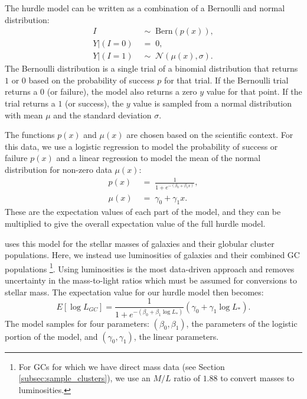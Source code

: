 \documentclass[twocolumn]{aastex631}
\begin{document}
The hurdle model can be written as a combination of a Bernoulli and normal distribution: 
\begin{align} \label{equ:hurdle_dist}
    I &\; \sim \; \mathrm{Bern}(p(x)), \nonumber \\
    Y|(I=0)& \; = \; 0, \\
    Y|(I=1)& \; \sim \; \mathcal{N}(\mu(x), \sigma). \nonumber 
\end{align}
The Bernoulli distribution is a single trial of a binomial distribution that returns $1$ or $0$ based on the probability of success $p$ for that trial. If the Bernoulli trial returns a $0$ (or failure), the model also returns a zero $y$ value for that point. If the trial returns a $1$ (or success), the $y$ value is sampled from a normal distribution with mean $\mu$ and the standard deviation $\sigma$. 

The functions $p(x)$ and $\mu(x)$ are chosen based on the scientific context. For this data, we use a logistic regression to model the probability of success or failure $p(x)$ and a linear regression to model the mean of the normal distribution for non-zero data $\mu(x)$: 
\begin{align}
    p(x) &\; = \; \frac{1}{1+e^{-(\beta_0+\beta_1 x)}}, \\
    \mu(x) & \; = \; \gamma_0 + \gamma_1 x. \nonumber
\end{align}
These are the expectation values of each part of the model, and they can be multiplied to give the overall expectation value of the full hurdle model. 

 uses this model for the stellar masses of galaxies and their globular cluster populations. Here, we instead use luminosities of galaxies and their combined GC populations \footnote{For GCs for which we have direct mass data (see Section \ref{subsec:sample_clusters}), we use an $M/L$ ratio of $1.88$ to convert masses to luminosities.}. Using luminosities is the most data-driven approach and removes uncertainty in the mass-to-light ratios which must be assumed for conversions to stellar mass. The expectation value for our hurdle model then becomes:
\begin{equation} \label{equ:hurdle}
E[\log{L_{GC}}]=\frac{1}{1+e^{-(\beta_0+\beta_1\log{L_*})}}(\gamma_0+\gamma_1\log{L_*}).  
\end{equation}
The model samples for four parameters: $(\beta_0, \beta_1)$, the parameters of the logistic portion of the model, and $(\gamma_0, \gamma_1)$, the linear parameters.
\end{document}
